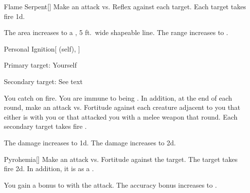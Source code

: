\lowercase{\hypertarget{spell:Flame Serpent}{}}\label{spell:Flame Serpent}
\begin{freeability}[Rank 3]{\hypertarget{spell:Flame Serpent}{Flame Serpent}}[]
Make an attack vs. Reflex against each target.
\hit Each target takes fire  \minus1d.

\rankline
{} The area increases to a \arealarge, 5 ft.\ wide shapeable line.
 The range increases to \rngmed.

\end{freeability}
\vspace{0.25em}



\lowercase{\hypertarget{spell:Personal Ignition}{}}\label{spell:Personal Ignition}
\begin{attuneability}[Rank 3]{\hypertarget{spell:Personal Ignition}{Personal Ignition}}[ (self), ]

Primary target: Yourself
\par\noindent
Secondary target: See text

You catch on fire.
You are immune to being .
In addition, at the end of each round, make an attack vs. Fortitude against each creature adjacent to you that either is  with you or that attacked you with a melee weapon that round.
\hit Each secondary target takes fire .

\rankline
{} The damage increases to  \plus1d.
 The damage increases to  \plus2d.

\end{attuneability}
\vspace{0.25em}



\lowercase{\hypertarget{spell:Pyrohemia}{}}\label{spell:Pyrohemia}
\begin{freeability}[Rank 3]{\hypertarget{spell:Pyrohemia}{Pyrohemia}}[]
Make an attack vs. Fortitude against the target.
\hit The target takes fire  \minus2d.
In addition, it is  as a .

\rankline
{} You gain a  bonus to  with the attack.
 The accuracy bonus increases to .

\end{freeability}
\vspace{0.25em}



